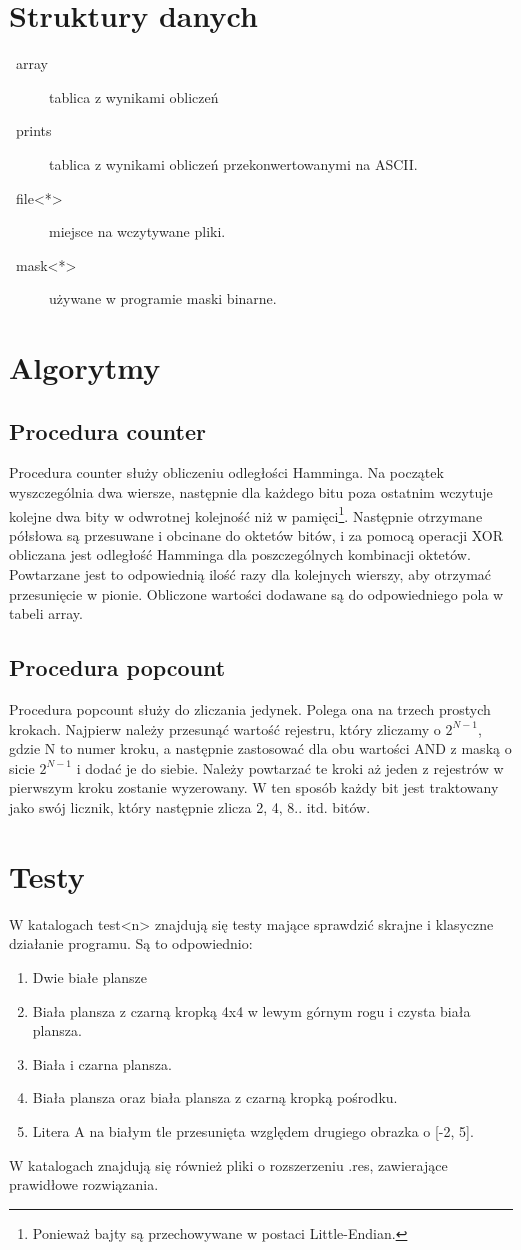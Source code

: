 \documentclass{article}
\newcommand\bitem[1]{\item[\textbullet~#1]}
\begin{document}
\section{Struktury danych}
\begin{description}
 \bitem{array} tablica z wynikami obliczeń
 \bitem{prints} tablica z wynikami obliczeń przekonwertowanymi na ASCII.
 \bitem{file<*>} miejsce na wczytywane pliki.
 \bitem{mask<*>} używane w programie maski binarne.
\end{description}

\section{Algorytmy}
\subsection{Procedura counter}
Procedura counter służy obliczeniu odległości Hamminga. Na początek wyszczególnia dwa wiersze, następnie dla każdego bitu poza ostatnim  
wczytuje kolejne dwa bity w odwrotnej kolejność niż w pamięci\footnote{Ponieważ bajty są przechowywane w postaci Little-Endian.}.
Następnie otrzymane półsłowa są przesuwane i obcinane do oktetów bitów, i za pomocą operacji XOR obliczana jest odległość Hamminga dla
poszczególnych kombinacji oktetów. Powtarzane jest to odpowiednią ilość razy dla kolejnych wierszy, aby otrzymać przesunięcie w pionie.
Obliczone wartości dodawane są do odpowiedniego pola w tabeli array.
\subsection{Procedura popcount}
Procedura popcount służy do zliczania jedynek. Polega ona na trzech prostych krokach. Najpierw należy przesunąć wartość rejestru, który 
zliczamy o $2^{N-1}$, gdzie N to numer kroku, a następnie zastosować dla obu wartości AND z maską o sicie $2^{N-1}$ i dodać je do siebie.
Należy powtarzać te kroki aż jeden z rejestrów w pierwszym kroku zostanie wyzerowany.
W ten sposób każdy bit jest traktowany jako swój licznik, który następnie zlicza 2, 4, 8.. itd. bitów.
\section{Testy}
W katalogach test<n> znajdują się testy mające sprawdzić skrajne i klasyczne działanie programu. Są to odpowiednio:
\begin{enumerate}
 \item Dwie białe plansze
 \item Biała plansza z czarną kropką 4x4 w lewym górnym rogu i czysta biała plansza.
 \item Biała i czarna plansza.
 \item Biała plansza oraz biała plansza z czarną kropką pośrodku.
 \item Litera A na białym tle przesunięta względem drugiego obrazka o [-2, 5].
\end{enumerate}
W katalogach znajdują się również pliki o rozszerzeniu .res, zawierające prawidłowe rozwiązania.
\end{document}
